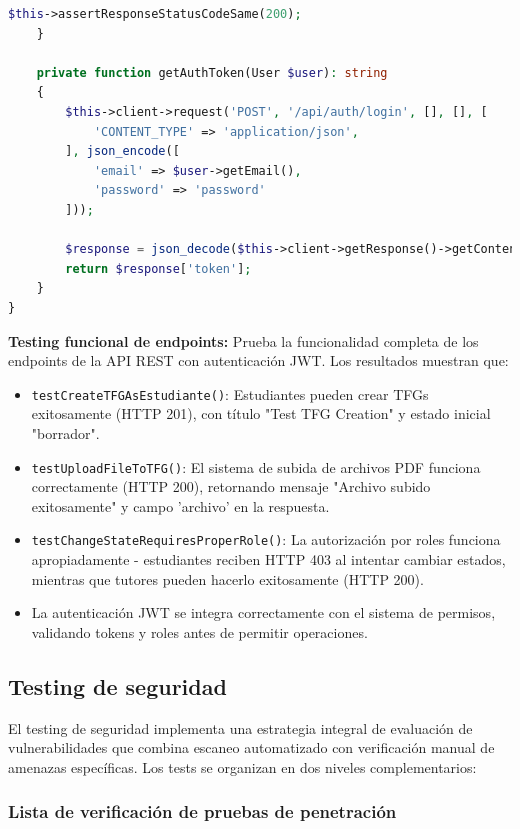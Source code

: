 \documentclass[12pt,a4paper,oneside]{report}
\begin{document}
\begin{lstlisting}[language=PHP]
        $this->assertResponseStatusCodeSame(200);
    }

    private function getAuthToken(User $user): string
    {
        $this->client->request('POST', '/api/auth/login', [], [], [
            'CONTENT_TYPE' => 'application/json',
        ], json_encode([
            'email' => $user->getEmail(),
            'password' => 'password'
        ]));

        $response = json_decode($this->client->getResponse()->getContent(), true);
        return $response['token'];
    }
}
\end{lstlisting}

\textbf{Testing funcional de endpoints:} Prueba la funcionalidad completa de los endpoints de la API REST con autenticación JWT. Los resultados muestran que:
\begin{itemize}
\item \texttt{testCreateTFGAsEstudiante()}: Estudiantes pueden crear TFGs exitosamente (HTTP 201), con título "Test TFG Creation" y estado inicial "borrador".
\item \texttt{testUploadFileToTFG()}: El sistema de subida de archivos PDF funciona correctamente (HTTP 200), retornando mensaje "Archivo subido exitosamente" y campo 'archivo' en la respuesta.
\item \texttt{testChangeStateRequiresProperRole()}: La autorización por roles funciona apropiadamente - estudiantes reciben HTTP 403 al intentar cambiar estados, mientras que tutores pueden hacerlo exitosamente (HTTP 200).
\item La autenticación JWT se integra correctamente con el sistema de permisos, validando tokens y roles antes de permitir operaciones.
\end{itemize}

\subsection{Testing de seguridad}\label{testing-de-seguridad}

El testing de seguridad implementa una estrategia integral de evaluación de vulnerabilidades que combina escaneo automatizado con verificación manual de amenazas específicas. Los tests se organizan en dos niveles complementarios:

\subsubsection{Lista de verificación de pruebas de penetración}\label{penetration-testing-checklist}
\end{document}
